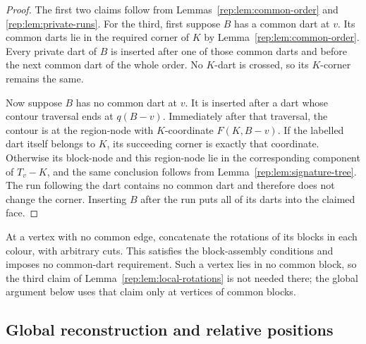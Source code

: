 \begin{proof}
The first two claims follow from Lemmas~\ref{rep:lem:common-order} and
\ref{rep:lem:private-runs}.  For the third, first suppose $B$ has a common
dart at $v$.  Its common darts lie in the required corner of $K$ by
Lemma~\ref{rep:lem:common-order}.  Every private dart of $B$ is inserted
after one of those common darts and before the next common dart of the
whole order.  No $K$-dart is crossed, so its $K$-corner remains the same.

Now suppose $B$ has no common dart at $v$.  It is inserted after a dart
whose contour traversal ends at $q(B-v)$.  Immediately after that
traversal, the contour is at the region-node with $K$-coordinate
$F(K,B-v)$.  If the labelled dart itself belongs to $K$, its succeeding
corner is exactly that coordinate.  Otherwise its block-node and this
region-node lie in the corresponding component of $T_v-K$, and the same
conclusion follows from Lemma~\ref{rep:lem:signature-tree}.  The run
following the dart contains no common dart and therefore does not change
the corner.  Inserting $B$ after the run puts all of its darts into the
claimed face.
\end{proof}

At a vertex with no common edge, concatenate the rotations of its blocks
in each colour, with arbitrary cuts.  This satisfies the block-assembly
conditions and imposes no common-dart requirement.  Such a vertex lies in
no common block, so the third claim of Lemma~\ref{rep:lem:local-rotations}
is not needed there; the global argument below uses that claim only at
vertices of common blocks.

\subsection{Global reconstruction and relative positions}
\label{rep:global}

